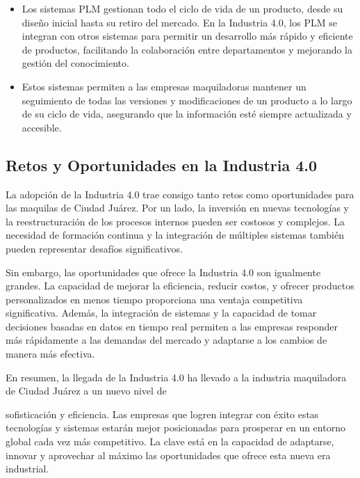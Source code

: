 \documentclass[
  letterpaper,
]{book}
\providecommand{\tightlist}{%
  \setlength{\itemsep}{0pt}\setlength{\parskip}{0pt}}\usepackage{longtable,booktabs,array}
\begin{document}
\begin{enumerate}
  \begin{itemize}
  \tightlist
  \item
    Los sistemas PLM gestionan todo el ciclo de vida de un producto,
    desde su diseño inicial hasta su retiro del mercado. En la Industria
    4.0, los PLM se integran con otros sistemas para permitir un
    desarrollo más rápido y eficiente de productos, facilitando la
    colaboración entre departamentos y mejorando la gestión del
    conocimiento.
  \item
    Estos sistemas permiten a las empresas maquiladoras mantener un
    seguimiento de todas las versiones y modificaciones de un producto a
    lo largo de su ciclo de vida, asegurando que la información esté
    siempre actualizada y accesible.
  \end{itemize}
\end{enumerate}

\subsection{Retos y Oportunidades en la Industria
4.0}\label{retos-y-oportunidades-en-la-industria-4.0}

La adopción de la Industria 4.0 trae consigo tanto retos como
oportunidades para las maquilas de Ciudad Juárez. Por un lado, la
inversión en nuevas tecnologías y la reestructuración de los procesos
internos pueden ser costosos y complejos. La necesidad de formación
continua y la integración de múltiples sistemas también pueden
representar desafíos significativos.

Sin embargo, las oportunidades que ofrece la Industria 4.0 son
igualmente grandes. La capacidad de mejorar la eficiencia, reducir
costos, y ofrecer productos personalizados en menos tiempo proporciona
una ventaja competitiva significativa. Además, la integración de
sistemas y la capacidad de tomar decisiones basadas en datos en tiempo
real permiten a las empresas responder más rápidamente a las demandas
del mercado y adaptarse a los cambios de manera más efectiva.

En resumen, la llegada de la Industria 4.0 ha llevado a la industria
maquiladora de Ciudad Juárez a un nuevo nivel de

sofisticación y eficiencia. Las empresas que logren integrar con éxito
estas tecnologías y sistemas estarán mejor posicionadas para prosperar
en un entorno global cada vez más competitivo. La clave está en la
capacidad de adaptarse, innovar y aprovechar al máximo las oportunidades
que ofrece esta nueva era industrial.
\end{document}
